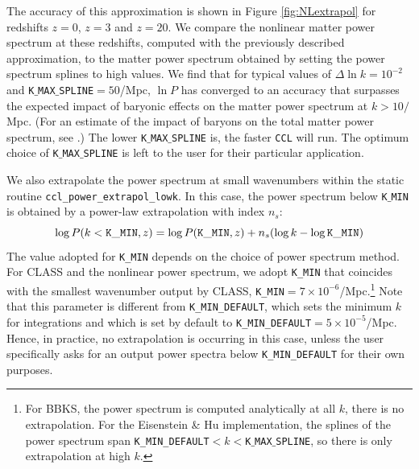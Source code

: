 \documentclass[\docopts]{\docclass}
\newcommand{\ccl}{{\tt CCL}\xspace}
\begin{document}
The accuracy of this approximation is shown in Figure \ref{fig:NLextrapol} for redshifts $z=0$, $z=3$ and $z=20$. We compare the nonlinear matter power spectrum at these redshifts, computed with the previously described approximation, to the matter power spectrum obtained by setting the power spectrum splines to high values. We find that for typical values of $\Delta \ln k=10^{-2}$ and {\tt K$\_$MAX$\_$SPLINE}$=50$/Mpc, $\ln P$ has converged to an accuracy that surpasses the expected impact of baryonic effects on the matter power spectrum at $k>10/$Mpc.  (For an estimate of the impact of baryons on the total matter power spectrum, see \citealt{Schneider15}.) The lower {\tt K$\_$MAX$\_$SPLINE} is, the faster \ccl will run. The optimum choice of {\tt K$\_$MAX$\_$SPLINE} is left to the user for their particular application.

We also extrapolate the power spectrum at small wavenumbers within the static routine {\tt ccl\_power\_extrapol\_lowk}. In this case, the power spectrum below {\tt K$\_$MIN} is obtained by a power-law extrapolation with index $n_s$:
\begin{equation}
  \log P(k<{\tt K\_MIN},z) = \log P({\tt K\_MIN},z) + n_s (\log k-\log{\tt K\_MIN})
\end{equation}
The value adopted for {\tt K\_MIN} depends on the choice of power spectrum method. For CLASS and the nonlinear power spectrum, we adopt {\tt K\_MIN} that coincides with the smallest wavenumber output by CLASS, {\tt K\_MIN}$=7\times 10^{-6}$/Mpc.\footnote{For BBKS, the power spectrum is computed analytically at all $k$, there is no extrapolation. For the Eisenstein \& Hu implementation, the splines of the power spectrum span {\tt K\_MIN\_DEFAULT}$<k<${\tt K$\_$MAX$\_$SPLINE}, so there is only extrapolation at high $k$.} Note that this parameter is different from {\tt K\_MIN\_DEFAULT}, which sets the minimum $k$ for integrations and which is set by default to {\tt K\_MIN\_DEFAULT}$=5\times 10^{-5}$/Mpc. Hence, in practice, no extrapolation is occurring in this case, unless the user specifically asks for an output power spectra below {\tt K\_MIN\_DEFAULT} for their own purposes.
\end{document}
